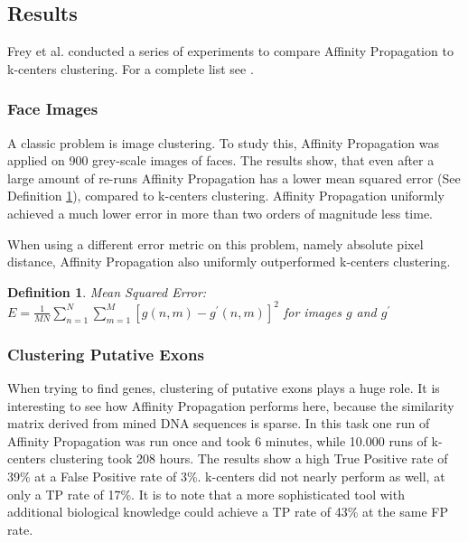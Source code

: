 \documentclass[11pt,a4paper]{article}
\newtheorem{definition}{Definition}
\begin{document}
\subsection{Results}
Frey et al. conducted a series of experiments to compare Affinity Propagation to k-centers clustering. For a complete list see \cite{frey2007clustering}.
\subsubsection{Face Images}
A classic problem is image clustering. To study this, Affinity Propagation was applied on 900 grey-scale images of faces. The results show, that even after a large amount of re-runs Affinity Propagation has a lower mean squared error (See Definition \ref{def:mse}), compared to k-centers clustering. Affinity Propagation uniformly achieved a much lower error in more than two orders of magnitude less time.

When using a different error metric on this problem, namely absolute pixel distance, Affinity Propagation also uniformly outperformed k-centers clustering.
\begin{definition} \label{def:mse}
	Mean Squared Error: $E = \frac{1}{M N}\sum\limits_{n=1}^{N}\sum\limits_{m=1}^{M} \left[g(n,m) - g^\prime (n,m)\right]^2$ for images $g$ and $g^\prime$
\end{definition}
\subsubsection{Clustering Putative Exons}
When trying to find genes, clustering of putative exons plays a huge role. It is interesting to see how Affinity Propagation performs here, because the similarity matrix derived from mined DNA sequences is sparse. In this task one run of Affinity Propagation was run once and took 6 minutes, while 10.000 runs of k-centers clustering took 208 hours. The results show a high True Positive rate of 39\% at a False Positive rate of 3\%. k-centers did not nearly perform as well, at only a TP rate of 17\%. It is to note that a more sophisticated tool with additional biological knowledge could achieve a TP rate of 43\% at the same FP rate.
\end{document}
